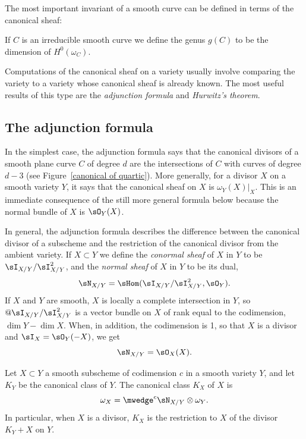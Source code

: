 The most important invariant of a smooth curve can be defined in terms of the canonical sheaf:

\begin{definition}
If $C$ is an irreducible smooth curve we define the genus $g(C)$ to be the dimension of $H^0(\omega_C)$.
\end{definition}

Computations of the canonical sheaf on a variety usually involve
comparing the variety to a variety 
whose
canonical sheaf is already known. The most useful results of this type
are  the \emph{adjunction formula}
and \emph{Hurwitz's theorem}. 

\subsection*{The adjunction formula}%

In the simplest case, the adjunction formula says that the canonical divisors of a smooth plane 
curve $C$ of degree $d$ are the intersections of $C$ with curves of degree $d-3$ 
(see Figure~\ref{canonical of quartic}). 
More generally, for a divisor $X$ on a smooth variety $Y$, it says that
the canonical sheaf on $X$ is $\omega_Y(X)|_X$. This is an immediate consequence of
the still more general formula below because the normal bundle of $X$ is $\sO_Y(X)$.

In general, the adjunction formula describes the difference between the canonical divisor of
a  subscheme and the restriction of the canonical divisor from the ambient variety.
If $X\subset Y$ we define the \emph{conormal sheaf} of $X$ in $Y$ to be $\sI_{X/Y}/\sI_{X/Y}^{2}$,
and the \emph{normal sheaf} of $X$ in $Y$ to be its dual, 
$$
\sN_{X/Y} = \sHom(\sI_{X/Y}/\sI_{X/Y}^{2}, \sO_{Y}).
$$
If $X$ and $Y$ are smooth, $X$ is locally a complete intersection in $Y$, so
 $@\sI_{X/Y}/\sI_{X/Y}^{2}$ 
is a vector bundle on $X$ of rank equal to the codimension, $\dim Y -\dim X$.
 When, in addition, the codimension is 1, so that $X$ is a divisor and $\sI_{X} = \sO_{Y}(-X)$, we get
 $$
 \sN_{X/Y} = \sO_{X}(X).
 $$


\begin{proposition}\label{adjunction}
 Let $X\subset Y$ a smooth subscheme of codimension $c$ in a smooth variety $Y$, and let $K_{Y}$ be the canonical class of $Y$. The canonical class $K_X$ of $X$ is 
%
 $$
 \omega_{X} = \mwedge^{c} \sN_{X/Y} \otimes \omega_{Y}.
 $$
In particular, when $X$ is a divisor, $K_{X}$ is the restriction to $X$ of the divisor $K_{Y}+X$ on $Y$.
\end{proposition}

